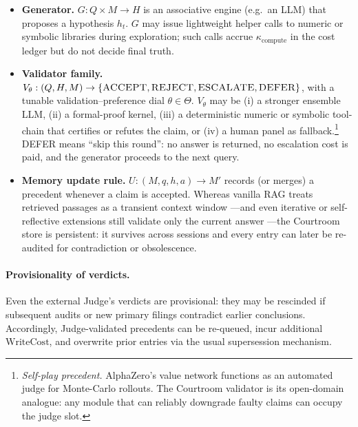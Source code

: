\documentclass[11pt]{article}
\newcommand{\WriteCost}{\mathrm{WriteCost}}
\begin{document}
\begin{itemize}
  \item \textbf{Generator.}  
  \(G : Q \times M \to H\) is an associative engine (e.g.\ an LLM) that proposes a
  hypothesis \(h_t\).  
  \(G\) may issue lightweight helper calls to numeric or symbolic libraries
  during exploration; such calls accrue \(\kappa_{\text{compute}}\) in the cost ledger
  but do not decide final truth.
  
  \item \textbf{Validator family.}  
  \(V_{\theta} : (Q, H, M) \to \{\textsc{ACCEPT}, \textsc{REJECT}, \textsc{ESCALATE}, \textsc{DEFER}\}\), with a
  tunable validation–preference dial \(\theta \in \Theta\).
  \(V_{\theta}\) may be
  (i) a stronger ensemble LLM,
  (ii) a formal-proof kernel,
  (iii) a deterministic numeric or symbolic tool-chain that certifies or refutes the claim, or
  (iv) a human panel as fallback.\footnote{\textit{Self-play precedent.}  
  AlphaZero's value network functions as an automated judge for Monte-Carlo rollouts.
  The Courtroom validator is its open-domain analogue: any module that can reliably
  downgrade faulty claims can occupy the judge slot.} \textsc{DEFER} means “skip this round”: no answer is returned,
  no escalation cost is paid, and the generator proceeds to the next
  query.
  
  \item \textbf{Memory update rule.}
  \(U : (M, q, h, a) \to M'\) records (or merges) a precedent whenever a claim is
  accepted.  Whereas vanilla RAG treats retrieved passages as a transient
  context window \citep{lewis2020rag}—and even iterative or self-reflective
  extensions still validate only the current answer
  \citep{shao2023iterretgen,asai2024selfrag}—the Courtroom store is
  persistent: it survives across sessions and every entry can later be
  re-audited for contradiction or obsolescence.

  \end{itemize}


\paragraph{Provisionality of verdicts.}
Even the external Judge’s verdicts are provisional: they may be rescinded
if subsequent audits or new primary filings contradict earlier
conclusions.  Accordingly, Judge-validated precedents can be re-queued,
incur additional \(\WriteCost\), and overwrite prior entries via the usual
supersession mechanism.
\end{document}
